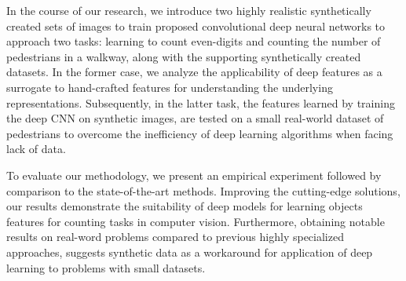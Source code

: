 \documentclass[11pt, oneside]{book}
\begin{document}

In the course of our research, we introduce two highly realistic synthetically created sets of images to train proposed convolutional deep neural networks to approach two tasks: learning to count even-digits and counting the number of pedestrians in a walkway, along with the supporting synthetically created datasets. In the former case, we analyze the applicability of deep features as a surrogate to hand-crafted features for understanding the underlying representations. Subsequently, in the latter task, the features learned by training the deep CNN on synthetic images, are tested on a small real-world dataset of pedestrians to overcome the inefficiency of deep learning algorithms when facing lack of data.


To evaluate our methodology, we present an empirical experiment followed by comparison to the state-of-the-art methods. Improving the cutting-edge solutions, our results demonstrate the suitability of deep models for learning objects features for counting tasks in computer vision. Furthermore, obtaining notable results on real-word problems compared to previous highly specialized approaches, suggests synthetic data as a workaround for application of deep learning to problems with small datasets. 

 



     



 


\tableofcontents

\listoffigures
\end{document}
